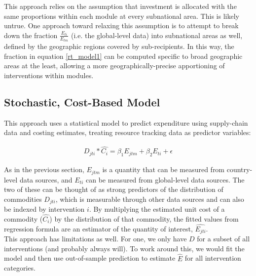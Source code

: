 \documentclass[twocolumn]{bmcart}%
\begin{document}
This approach relies on the assumption that investment is allocated with the same proportions within each module at every subnational area. This is likely untrue. One approach toward relaxing this assumption is to attempt to break down the fraction $\frac{E_{ti}}{E_{tm}}$ (i.e. the global-level data) into subnational areas as well, defined by the geographic regions covered by sub-recipients. In this way, the fraction in equation \ref{rt_model1} can be computed specific to broad geographic areas at the least, allowing a more geographically-precise apportioning of interventions within modules.

\subsection{Stochastic, Cost-Based Model}

This approach uses a statistical model to predict expenditure using supply-chain data and costing estimates, treating resource tracking data as predictor variables:

\begin{align}
  D_{jti} * \widehat{C_i} = \beta_1 E_{jtm} + \beta_2 E_{ti} + \epsilon
\end{align}

As in the previous section, $E_{jtm}$ is a quantity that can be measured from country-level data sources, and $E_{ti}$ can be measured from global-level data sources. The two of these can be thought of as strong predictors of the distribution of commodities $D_{jti}$, which is measurable through other data sources and can also be indexed by intervention $i$. By multiplying the estimated unit cost of a commodity ($\widehat{C_i}$) by the distribution of that commodity, the fitted values from regression formula are an estimator of the quantity of interest, $\widehat{E_{jti}}$. \\

This approach has limitations as well. For one, we only have $D$ for a subset of all interventions (and probably always will). To work around this, we would fit the model and then use out-of-sample prediction to estimate $\hat{E}$ for all intervention categories. \\

\end{document}
